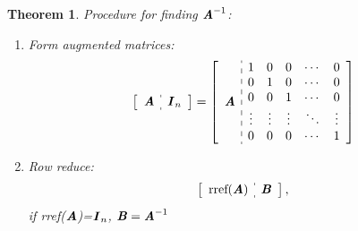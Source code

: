 \documentclass[12pt, a4paper]{article}
\newtheorem{thm}{Theorem}[subsection]
\def\matrixA{\textbf{\emph{A}}}
\def\matrixB{\textbf{\emph{B}}}
\def\matrixI{\textbf{\emph{I}}}
\begin{document}
\begin{thm}
	Procedure for finding $\matrixA^{-1}$:
	\begin{enumerate}
		\item Form augmented matrices: \[\left[\begin{array}{c:c}\matrixA&\matrixI_n\end{array}\right]=\left[\begin{array}{c:c}\matrixA&\begin{matrix}1&0&0&\cdots&0\\0&1&0&\cdots&0\\0&0&1&\cdots&0\\\vdots&\vdots&\vdots&\ddots&\vdots\\0&0&0&\cdots&1\end{matrix}\end{array}\right]\]
		\item Row reduce: \[\left[\begin{array}{c:c}\text{rref}(\matrixA)&\matrixB\end{array}\right],\] if rref($\matrixA$)=$\matrixI_n$, $\matrixB=\matrixA^{-1}$
	\end{enumerate}
\end{thm}
\end{document}
